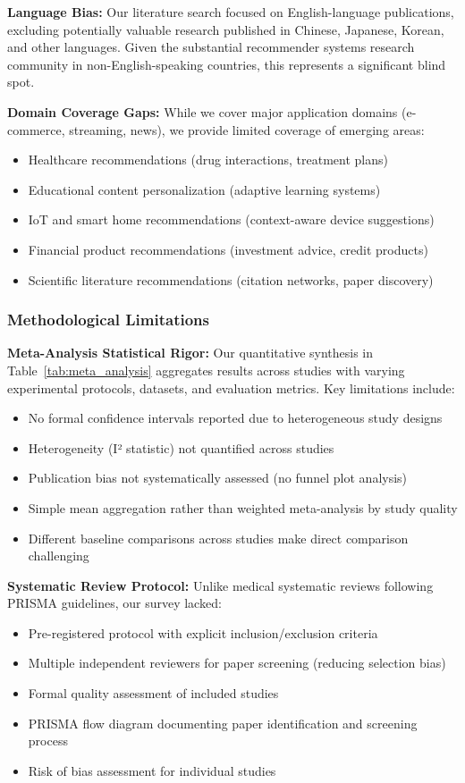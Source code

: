 \textbf{Language Bias:} Our literature search focused on English-language publications, excluding potentially valuable research published in Chinese, Japanese, Korean, and other languages. Given the substantial recommender systems research community in non-English-speaking countries, this represents a significant blind spot.

\textbf{Domain Coverage Gaps:} While we cover major application domains (e-commerce, streaming, news), we provide limited coverage of emerging areas:
\begin{itemize}
    \item Healthcare recommendations (drug interactions, treatment plans)
    \item Educational content personalization (adaptive learning systems)
    \item IoT and smart home recommendations (context-aware device suggestions)
    \item Financial product recommendations (investment advice, credit products)
    \item Scientific literature recommendations (citation networks, paper discovery)
\end{itemize}

\subsubsection{Methodological Limitations}

\textbf{Meta-Analysis Statistical Rigor:} Our quantitative synthesis in Table~\ref{tab:meta_analysis} aggregates results across studies with varying experimental protocols, datasets, and evaluation metrics. Key limitations include:
\begin{itemize}
    \item No formal confidence intervals reported due to heterogeneous study designs
    \item Heterogeneity (I² statistic) not quantified across studies
    \item Publication bias not systematically assessed (no funnel plot analysis)
    \item Simple mean aggregation rather than weighted meta-analysis by study quality
    \item Different baseline comparisons across studies make direct comparison challenging
\end{itemize}

\textbf{Systematic Review Protocol:} Unlike medical systematic reviews following PRISMA guidelines, our survey lacked:
\begin{itemize}
    \item Pre-registered protocol with explicit inclusion/exclusion criteria
    \item Multiple independent reviewers for paper screening (reducing selection bias)
    \item Formal quality assessment of included studies
    \item PRISMA flow diagram documenting paper identification and screening process
    \item Risk of bias assessment for individual studies
\end{itemize}

